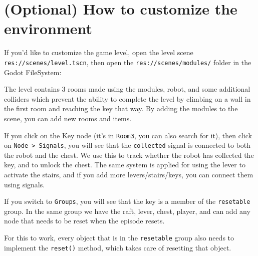 \documentclass[11pt,a4paper]{article}
\begin{document}
\section{(Optional) How to customize the environment}\label{optional-how-to-customize-the-environment}

If you'd like to customize the game level, open the level scene \passthrough{\lstinline!res://scenes/level.tscn!}, then open the \passthrough{\lstinline!res://scenes/modules/!} folder in the Godot FileSystem:


The level contains 3 rooms made using the modules, robot, and some additional colliders which prevent the ability to complete the level by climbing on a wall in the first room and reaching the key that way. By adding the modules to the scene, you can add new rooms and items.

If you click on the Key node (it's in \passthrough{\lstinline!Room3!}, you can also search for it), then click on \passthrough{\lstinline!Node > Signals!}, you will see that the \passthrough{\lstinline!collected!} signal is connected to both the robot and the chest. We use this to track whether the robot has collected the key, and to unlock the chest. The same system is applied for using the lever to activate the stairs, and if you add more levers/stairs/keys, you can connect them using signals.


If you switch to \passthrough{\lstinline!Groups!}, you will see that the key is a member of the \passthrough{\lstinline!resetable!} group. In the same group we have the raft, lever, chest, player, and can add any node that needs to be reset when the episode resets.


For this to work, every object that is in the \passthrough{\lstinline!resetable!} group also needs to implement the \passthrough{\lstinline!reset()!} method, which takes care of resetting that object.
\end{document}
